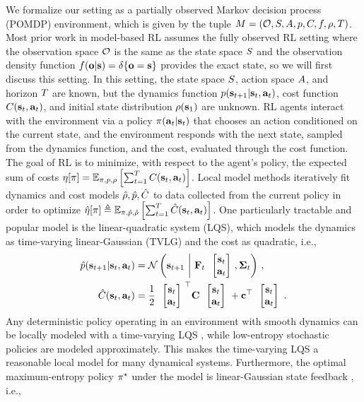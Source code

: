 We formalize our setting as a partially observed Markov decision process (POMDP) environment, which is given by the tuple $M=(\mathcal{O},S,A,p,C,f,\rho,T)$. Most prior work in model-based RL assumes the fully observed RL setting where the observation space $\mathcal{O}$ is the same as the state space $S$ and the observation density function $f(\mathbf{o}|\mathbf{s})=\delta\{\mathbf{o}=\mathbf{s}\}$ provides the exact state, so we will first discuss this setting. In this setting, the state space $S$, action space $A$, and horizon $T$ are known, but the dynamics function $p(\mathbf{s}_{t+1}|\mathbf{s}_t,\mathbf{a}_t)$, cost function $C(\mathbf{s}_t,\mathbf{a}_t)$, and initial state distribution $\rho(\mathbf{s}_1)$ are unknown. RL agents interact with the environment via a policy $\pi(\mathbf{a}_t|\mathbf{s}_t)$ that chooses an action conditioned on the current state, and the environment responds with the next state, sampled from the dynamics function, and the cost, evaluated through the cost function. The goal of RL is to minimize, with respect to the agent's policy, the expected sum of costs $\eta[\pi]=\mathbb{E}_{\pi,p,\rho}\left[\sum_{t=1}^TC(\mathbf{s}_t,\mathbf{a}_t)\right]$. Local model methods iteratively fit dynamics and cost models $\hat{\rho},\hat{p},\hat{C}$ to data collected from the current policy in order to optimize $\hat{\eta}[\pi]\triangleq\mathbb{E}_{\pi,\hat{p},\hat{\rho}}\left[\sum_{t=1}^T\hat{C}(\mathbf{s}_t,\mathbf{a}_t)\right]$. One particularly tractable and popular model is the linear-quadratic system (LQS), which models the dynamics as time-varying linear-Gaussian (TVLG) and the cost as quadratic, i.e.,
\begin{align*}
    \dynmodel(\state_{t+1}|\state_t,\action_t)&=\mathcal{N}\left(\state_{t+1}~\bigg|~\dynmat_t\colvec{\state_t\\\action_t},\dyncovar_t\right)\,,\\
    \costmodel(\state_t,\action_t)&=\frac{1}{2}\colvec{\state_t\\\action_t}^\top\costmat\colvec{\state_t\\\action_t}+\costvec^\top\colvec{\state_t\\\action_t}\,.
\end{align*}
Any deterministic policy operating in an environment with smooth dynamics can be locally modeled with a time-varying LQS \citep{convex}, while low-entropy stochastic policies are modeled approximately. This makes the time-varying LQS a reasonable local model for many dynamical systems. Furthermore, the optimal maximum-entropy policy $\pi^\star$ under the model is linear-Gaussian state feedback \citep{ddp}, i.e.,
